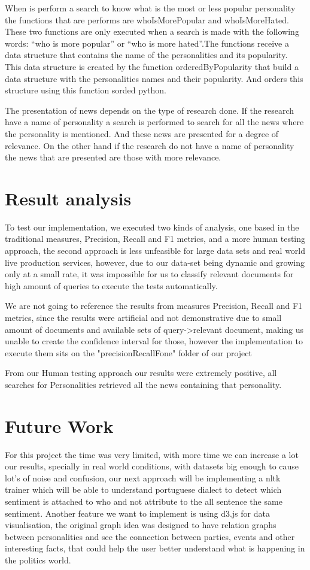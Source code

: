 \documentclass{acm_proc_article-sp}
\begin{document}
When is perform a search to know what is the most or less popular personality the functions that are performs are whoIsMorePopular and whoIsMoreHated. These two functions are only executed when a search is made with the following words: “who is more popular” or “who is more hated”.The functions receive a data structure that contains the name of the personalities and its popularity. This data structure is created by the function orderedByPopularity that build a data structure with the personalities names and their popularity. And orders this structure using this function sorded python.

The presentation of news depends on the type of research done. If the research have a name of personality a search is performed to search for all the news where the personality is mentioned. And these news are presented for a degree of relevance. On the other hand if the research do not have a name of personality the news that are presented are those with more relevance.

\section{Result analysis}
To test our implementation, we executed two kinds of analysis, one based in the traditional measures, Precision, Recall and F1 metrics, and a more human testing approach, the second approach is less unfeasible for large data sets and real world live production services, however, due to our data-set being dynamic and growing only at a small rate, it was impossible for us to classify relevant documents for high amount of queries to execute the tests automatically.

We are not going to reference the results from measures Precision, Recall and F1 metrics, since the results were artificial and not demonstrative due to small amount of documents and available sets of query->relevant document, making us unable to create the confidence interval for those, however the implementation to execute them sits on the "precisionRecallFone" folder of our project

From our Human testing approach our results were extremely positive, all searches for Personalities retrieved all the news containing that personality.

\section{Future Work}
For this project the time was very limited, with more time we can increase a lot our results, specially in real world conditions, with datasets big enough to cause lot's of noise and confusion, our next approach will be implementing a nltk trainer which will be able to understand portuguese dialect to detect which sentiment is attached to who and not attribute to the all sentence the same sentiment.
Another feature we want to implement is using d3.js for data visualisation, the original graph idea was designed to have relation graphs between personalities and see the connection between parties, events and other interesting facts, that could help the user better understand what is happening in the politics world.
\end{document}
